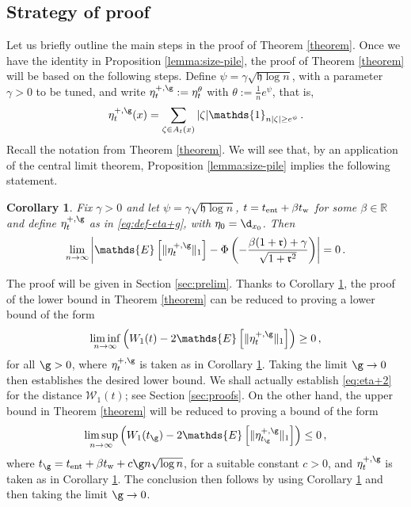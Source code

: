 \documentclass[11pt,reqno]{amsart}
\newtheorem{corollary}[theorem]{Corollary}
\theoremstyle{remark}
\theoremstyle{definition}
\numberwithin{equation}{section}
\numberwithin{figure}{section}
\newcommand{\E}{\mathds{E}}
\newcommand{\R}{\mathbb{R}}
\newcommand{\car}{\mathds{1}}
\newcommand{\cW}{\ensuremath{\mathcal W}}
\begin{document}
	\subsection{Strategy of proof}
	Let us briefly outline the main steps in the proof of Theorem \ref{theorem}.
	Once we have the identity in Proposition \ref{lemma:size-pile}, the proof   of Theorem \ref{theorem} will be based on the following steps. 
	 	 Define $\psi =\gamma \sqrt{\mathfrak h\log n}$, with a parameter $\gamma>0$ to be tuned, and write $\eta^{+,\g}_t:=\eta^\theta_t$ with $\theta:=\frac1ne^\psi$, that is,
\begin{equation}\label{eq:def-eta+g}
\eta_t^{+,\g}(x)=\sum_{\zeta\in A_t(x)} |\zeta|\car_{n|\zeta|\ge e^{\psi}}\,.
\end{equation}
Recall the notation from Theorem \ref{theorem}. 
We will see that, by
an application of the central limit theorem, Proposition \ref{lemma:size-pile} implies the following statement. 
\begin{corollary}\label{coro:CLT-pile}
		Fix $\gamma>0$ and let $\psi=\gamma\sqrt{\mathfrak{h}\log n}$, $t=t_{\rm ent}+\beta t_{\rm w}$ for some $\beta\in\R$ and define $\eta^{+,\g}_t$ as in \eqref{eq:def-eta+g}, with  $\eta_0=\d_{x_0}$. Then
		\begin{equation}
			\lim_{n\to \infty}	\left|\E\left[\|\eta^{+,\g}_t\|_1\right]-\Phi\left(-\frac{\beta(1+\mathfrak{r})+\gamma}{\sqrt{1+\mathfrak{r}^2}}\right)\right|=0 \,.
		\end{equation}
	\end{corollary}
The proof will be given in Section \ref{sec:prelim}.
Thanks to Corollary \ref{coro:CLT-pile},
the proof of the lower bound in Theorem \ref{theorem} can be reduced to proving a lower bound of the form 
\begin{equation}\label{eq:eta+2}
\liminf_{n\to\infty} \left(W_1(t)-  2\E\left[\|\eta^{+,\g}_t\|_1\right]\right)\ge 0\,,
\end{equation}
for all $\g>0$, where $\eta^{+,\g}_t$ is taken as in Corollary \ref{coro:CLT-pile}. Taking the limit $\g\to 0$ then establishes the desired lower bound. 
We shall actually establish \eqref{eq:eta+2} for the distance $\cW_1(t)$; see Section \ref{sec:proofs}. On the other hand,  the upper bound in Theorem \ref{theorem} will be reduced to proving a bound of the form 
\begin{equation}\label{eq:eta+22}
\limsup_{n\to\infty} \left(W_1(t_\g)-   2\E\left[\|\eta^{+,\g}_{t_\g}\|_1\right]\right)\le 0\,,
\end{equation}
where $t_\g = t_{\rm ent}+\beta t_{\rm w} + c\g n\sqrt{\log n}$, for a suitable constant $c>0$, and $\eta^{+,\g}_t$ is taken as in Corollary \ref{coro:CLT-pile}.  The conclusion then follows by using Corollary \ref{coro:CLT-pile} and then taking the limit $\g\to 0$. 
\end{document}
